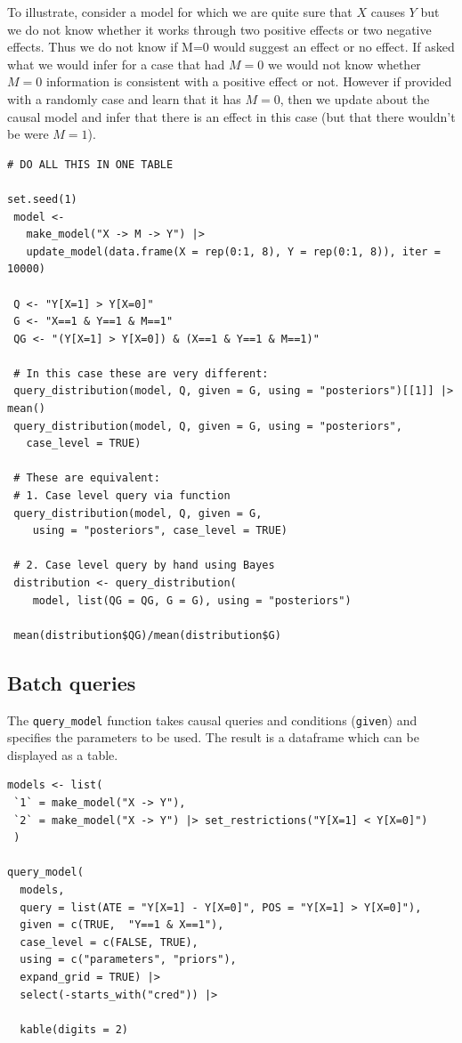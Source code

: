 \documentclass[
  article]{jss}
\begin{document}
To illustrate, consider a model for which we are quite sure that \(X\)
causes \(Y\) but we do not know whether it works through two positive
effects or two negative effects. Thus we do not know if M=0 would
suggest an effect or no effect. If asked what we would infer for a case
that had \(M=0\) we would not know whether \(M=0\) information is
consistent with a positive effect or not. However if provided with a
randomly case and learn that it has \(M=0\), then we update about the
causal model and infer that there is an effect in this case (but that
there wouldn't be were \(M=1\)).

\begin{verbatim}
# DO ALL THIS IN ONE TABLE

set.seed(1)
 model <-
   make_model("X -> M -> Y") |>
   update_model(data.frame(X = rep(0:1, 8), Y = rep(0:1, 8)), iter = 10000)

 Q <- "Y[X=1] > Y[X=0]"
 G <- "X==1 & Y==1 & M==1"
 QG <- "(Y[X=1] > Y[X=0]) & (X==1 & Y==1 & M==1)"

 # In this case these are very different:
 query_distribution(model, Q, given = G, using = "posteriors")[[1]] |> mean()
 query_distribution(model, Q, given = G, using = "posteriors",
   case_level = TRUE)

 # These are equivalent:
 # 1. Case level query via function
 query_distribution(model, Q, given = G,
    using = "posteriors", case_level = TRUE)

 # 2. Case level query by hand using Bayes
 distribution <- query_distribution(
    model, list(QG = QG, G = G), using = "posteriors")

 mean(distribution$QG)/mean(distribution$G)
\end{verbatim}

\hypertarget{batch-queries}{%
\subsection{Batch queries}\label{batch-queries}}

The \texttt{query\_model} function takes causal queries and conditions
(\texttt{given}) and specifies the parameters to be used. The result is
a dataframe which can be displayed as a table.

\begin{verbatim}
models <- list(
 `1` = make_model("X -> Y"),
 `2` = make_model("X -> Y") |> set_restrictions("Y[X=1] < Y[X=0]")
 )

query_model(
  models,
  query = list(ATE = "Y[X=1] - Y[X=0]", POS = "Y[X=1] > Y[X=0]"),
  given = c(TRUE,  "Y==1 & X==1"),
  case_level = c(FALSE, TRUE),
  using = c("parameters", "priors"),
  expand_grid = TRUE) |>
  select(-starts_with("cred")) |>
  
  kable(digits = 2)
\end{verbatim}
\end{document}
